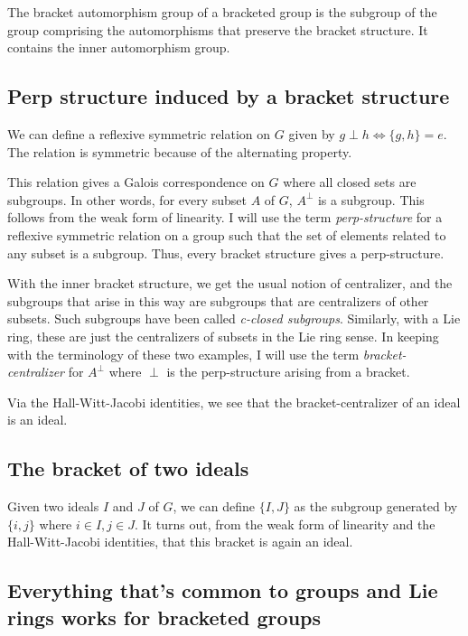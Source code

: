 \documentclass[10pt]{amsart}
\begin{document}
The bracket automorphism group of a bracketed group is the subgroup of
the group comprising the automorphisms that preserve the bracket
structure. It contains the inner automorphism group.

\subsection{Perp structure induced by a bracket structure}

We can define a reflexive symmetric relation on $G$ given by $g \perp
h \iff \{ g,h \} = e$. The relation is symmetric because of the
alternating property. 

This relation gives a Galois correspondence on $G$ where all closed
sets are subgroups. In other words, for every subset $A$ of $G$,
$A^\perp$ is a subgroup. This follows from the weak form of
linearity. I will use the term {\em perp-structure} for a reflexive
symmetric relation on a group such that the set of elements related to
any subset is a subgroup. Thus, every bracket structure gives a
perp-structure.

With the inner bracket structure, we get the usual notion of
centralizer, and the subgroups that arise in this way are subgroups
that are centralizers of other subsets. Such subgroups have been
called {\em c-closed subgroups}. Similarly, with a Lie ring, these are
just the centralizers of subsets in the Lie ring sense. In keeping
with the terminology of these two examples, I will use the term {\em
bracket-centralizer} for $A^\perp$ where $\perp$ is the perp-structure
arising from a bracket.

Via the Hall-Witt-Jacobi identities, we see that the
bracket-centralizer of an ideal is an ideal.

\subsection{The bracket of two ideals}

Given two ideals $I$ and $J$ of $G$, we can define $\{ I, J \}$ as the
subgroup generated by $\{ i,j \}$ where $i \in I, j \in J$. It turns
out, from the weak form of linearity and the Hall-Witt-Jacobi
identities, that this bracket is again an ideal.

\subsection{Everything that's common to groups and Lie rings works for bracketed groups}
\end{document}
